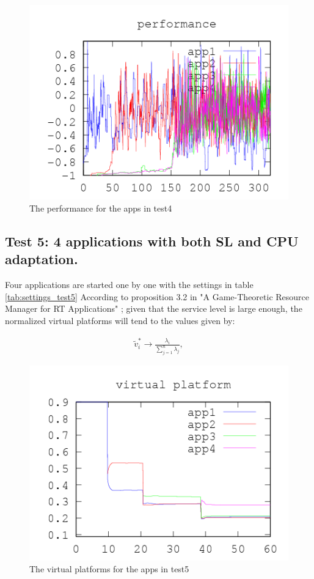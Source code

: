 \documentclass[nobiblatex]{LTHthesis}
\newcommand{\tv}{\tilde{v}}
\begin{document}
\begin{figure}[!H]
  \centering
  \includegraphics{"tools/plot/logs/test4/f"}
  \caption{The performance for the apps in test4}
  \label{fig:test4_f}
\end{figure}



\subsection{Test 5: 4 applications with both SL and CPU adaptation.}
Four applications are started one by one with the settings in table \ref{tab:settings_test5}
According to proposition 3.2 in "A Game-Theoretic Resource Manager for RT Applications" \cite{gtrm};
given that the service level is large enough, the normalized virtual platforms will tend to the values given by:


  \begin{eqnarray}	\label{eq:SpecialStationaryPoint}
    \tv_i^* \to \frac{\lambda_i}{\sum_{j=1}^{n}\lambda_j},
  \end{eqnarray}

\begin{figure}[!H]
  \centering
  \includegraphics{"tools/plot/logs/test5/vp"}
  \caption{The virtual platforms for the apps in test5}
  \label{fig:test5_vp}
\end{figure}
\end{document}
